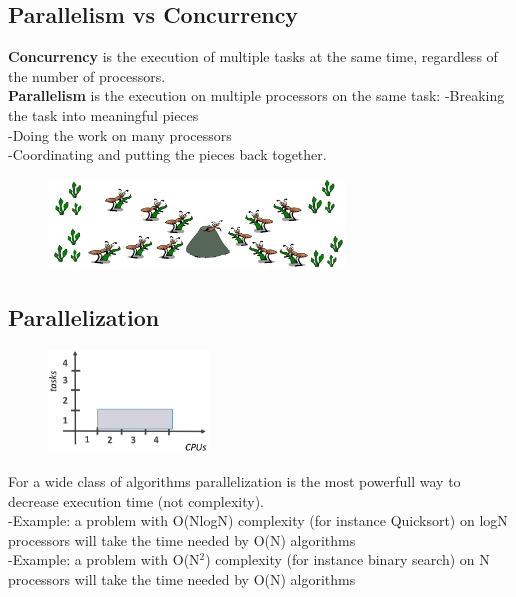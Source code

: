 \newpage
\clearpage

\subsection{Parallelism vs Concurrency}

\textbf{Concurrency} is the execution of multiple tasks at the same time, regardless
of the number of processors.\\
\textbf{Parallelism} is the execution on multiple processors on the same task:
-Breaking the task into meaningful pieces\\
-Doing the work on many processors\\
-Coordinating and putting the pieces back together.


\begin{figure}[ht]
    \centering
    \includegraphics[width=0.7\textwidth]{figure_parallel/ant_parallelism.png}\end{figure}
\FloatBarrier


\subsection{Parallelization}

\begin{figure}
  \begin{center}
    \includegraphics[width=0.38\textwidth]{figure_parallel/parallelization.png}
  \end{center}
\end{figure}

For a wide class of algorithms parallelization is the most powerfull way to decrease execution time (not complexity).\\
-Example: a problem with O(NlogN) complexity (for
instance Quicksort) on logN processors will take the
time needed by O(N) algorithms\\
-Example: a problem with O(N$^2$) complexity (for
instance binary search) on N processors will take the
time needed by O(N) algorithms\\

